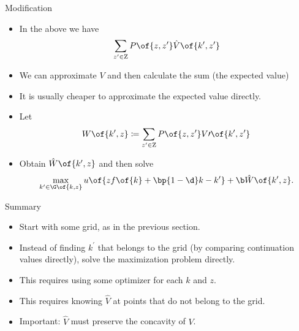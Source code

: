 \documentclass[11pt,xcolor={dvipsnames},aspectratio=159,hyperref={pdftex,pdfpagemode=UseNone,hidelinks,pdfdisplaydoctitle=true},usepdftitle=false]{beamer}
\begin{document}
        \begin{frame}{Modification}   
            \begin{itemize}
                \item In the above we have \begin{align*}
                   \sum_{z^\prime \in \text{Z}} P\of{z,z^\prime} \hat{V}\of{k^\prime,z^\prime} 
                \end{align*}
                \item We can approximate $V$ and then calculate the sum (the expected value)
                \item It is usually cheaper to approximate the expected value directly.
                \item Let \begin{align*} W\of{k^\prime,z}\coloneq \sum_{z^\prime \in \text{Z}} P\of{z,z^\prime} V\prime\of{k^\prime,z^\prime} \end{align*}
                \item Obtain $\hat{W}\of{k^\prime,z}$ and then solve \begin{align*}
                    \max_{k^\prime \in \G\of{k,z}} u\of{z f\of{k} + \bp{1-\d}k - k^\prime} + \b \hat{W}\of{k^\prime,z}.
                \end{align*}
            \end{itemize}
            \end{frame}  
    
    \begin{frame}{Summary}   
        \begin{itemize}
            \item Start with some grid, as in the previous section.
            \item Instead of finding $k^\prime$ that belongs to the grid (by comparing continuation values directly), solve the maximization problem directly.
            \item This requires using some optimizer for each $k$ and $z$.
            \item This requires knowing $\hat{V}$ at points that do not belong to the grid.
            \item Important: $\hat{V}$ must preserve the concavity of $V$.
        \end{itemize}
        \end{frame}     

    \begin{frame}
        \end{frame}
\end{document}
